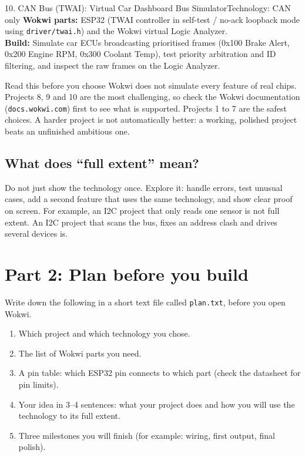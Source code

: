 \documentclass[11pt,a4paper]{article}
\begin{document}
\begin{proj}{10. CAN Bus (TWAI): Virtual Car Dashboard Bus Simulator}{Technology: CAN only}
\textbf{Wokwi parts:} ESP32 (TWAI controller in self-test / no-ack loopback mode using \texttt{driver/twai.h}) and the Wokwi virtual Logic Analyzer.\\
\textbf{Build:} Simulate car ECUs broadcasting prioritised frames (0x100 Brake Alert, 0x200 Engine RPM, 0x300 Coolant Temp), test priority arbitration and ID filtering, and inspect the raw frames on the Logic Analyzer.
\end{proj}

\begin{note}{Read this before you choose}
Wokwi does not simulate every feature of real chips. Projects 8, 9 and 10 are the most challenging, so check the Wokwi documentation (\texttt{docs.wokwi.com}) first to see what is supported. Projects 1 to 7 are the safest choices. A harder project is not automatically better: a working, polished project beats an unfinished ambitious one.
\end{note}

\subsection*{What does ``full extent'' mean?}
Do not just show the technology once. Explore it: handle errors, test unusual cases, add a second feature that uses the same technology, and show clear proof on screen. For example, an I2C project that only reads one sensor is not full extent. An I2C project that scans the bus, fixes an address clash and drives several devices is.

\section*{Part 2: Plan before you build}
Write down the following in a short text file called \texttt{plan.txt}, before you open Wokwi.
\begin{enumerate}
\item Which project and which technology you chose.
\item The list of Wokwi parts you need.
\item A pin table: which ESP32 pin connects to which part (check the datasheet for pin limits).
\item Your idea in 3--4 sentences: what your project does and how you will use the technology to its full extent.
\item Three milestones you will finish (for example: wiring, first output, final polish).
\end{enumerate}
\end{document}

